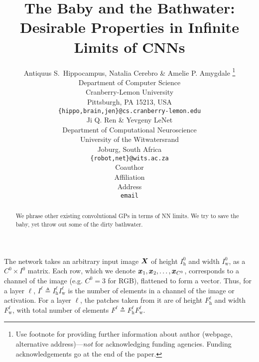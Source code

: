 \documentclass{article} %
\title{The Baby and the Bathwater: 
Desirable Properties in Infinite Limits of CNNs}
\author{Antiquus S.~Hippocampus, Natalia Cerebro \& Amelie P. Amygdale \thanks{ Use footnote for providing further information
about author (webpage, alternative address)---\emph{not} for acknowledging
funding agencies.  Funding acknowledgements go at the end of the paper.} \\
Department of Computer Science\\
Cranberry-Lemon University\\
Pittsburgh, PA 15213, USA \\
\texttt{\{hippo,brain,jen\}@cs.cranberry-lemon.edu} \\
\And
Ji Q. Ren \& Yevgeny LeNet \\
Department of Computational Neuroscience \\
University of the Witwatersrand \\
Joburg, South Africa \\
\texttt{\{robot,net\}@wits.ac.za} \\
\AND
Coauthor \\
Affiliation \\
Address \\
\texttt{email}
}
\newcommand{\ssup}[1]{^{#1}}
\newcommand{\eqdef}{\triangleq}
\newcommand{\Iw}[1]{{I\ssup{#1}_\text{w}}}
\newcommand{\Iwl}[1]{\Iw{\ell #1}}
\newcommand{\Ih}[1]{{I\ssup{#1}_\text{h}}}
\newcommand{\Ihl}[1]{\Ih{\ell #1}}
\newcommand{\Fw}[1]{{F\ssup{#1}_\text{w}}}
\newcommand{\Fwl}[1]{\Fw{\ell #1}}
\newcommand{\Fh}[1]{{F\ssup{#1}_\text{h}}}
\newcommand{\Fhl}[1]{\Fh{\ell #1}}
\newcommand{\chan}[1]{{C\ssup{#1}}}
\begin{document}
\maketitle

\begin{abstract}
  We phrase other existing convolutional GPs in terms of NN limits. We try to
  save the baby, yet throw out some of the dirty bathwater.
\end{abstract}

The network takes an arbitrary input image ${\bm{X}}$ of height $\Ih{0}$ and width
$\Iw{0}$, as a $\chan{0} \times I\ssup{0}$ matrix. Each row, which we denote
$\vx_1,\vx_2,\dotsc,\vx_{\chan{0}}$, corresponds to a channel of the image (e.g.
$\chan{0} = 3$ for RGB), flattened to form a vector. Thus, for a layer $\ell$, $I\ssup{\ell} \eqdef
\Ihl{}\Iwl{}$ is the number of elements in a channel of the image or activation.
For a layer $\ell$, the patches taken from it are of height $\Fhl{}$ and width
$\Fwl{}$, with total number of elements $F\ssup{\ell} \eqdef \Fhl{}\Fwl{}$.
\end{document}
